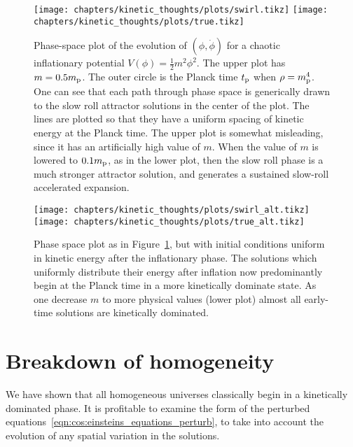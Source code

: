 \begin{figure}[tp]
  \centering
  \texttt{[image: chapters/kinetic\_thoughts/plots/swirl.tikz]}
  \texttt{[image: chapters/kinetic\_thoughts/plots/true.tikz]}
  \caption{Phase-space plot of the evolution of $(\phi,\dot{\phi})$ for a chaotic inflationary potential $V(\phi) = \frac{1}{2}m^2 \phi^2$. The upper plot has $m=0.5m_{\mathrm{p}}$. The outer circle is the Planck time $t_{\mathrm{p}}$ when $\rho=m_{\mathrm{p}}^4$. One can see that each path through phase space is generically drawn to the slow roll attractor solutions in the center of the plot. The lines are plotted so that they have a uniform spacing of kinetic energy at the Planck time.
  The upper plot is somewhat misleading, since it has an artificially high value of $m$. When the value of $m$ is lowered to $0.1m_{\mathrm{p}}$, as in the lower plot, then the slow roll phase is a much stronger attractor solution, and generates a sustained slow-roll accelerated expansion.\label{fig:kt:linde}}
\end{figure}

\begin{figure}[tp]
  \centering
  \texttt{[image: chapters/kinetic\_thoughts/plots/swirl\_alt.tikz]}
  \texttt{[image: chapters/kinetic\_thoughts/plots/true\_alt.tikz]}
  \caption{Phase space plot as in Figure~\protect\ref{fig:kt:linde}, but with initial conditions uniform in kinetic energy after the inflationary phase. The solutions which uniformly distribute their energy after inflation now predominantly begin at the Planck time in a more kinetically dominate state. As one decrease $m$ to more physical values (lower plot) almost all early-time solutions are kinetically dominated.\label{fig:kt:b4infl}}
\end{figure}




\section{Breakdown of homogeneity}
We have shown that all homogeneous universes classically begin in a kinetically dominated phase. It is profitable to examine the form of the perturbed equations~\eqref{eqn:cos:einsteins_equations_perturb}, to take into account the evolution of any spatial variation in the solutions.

